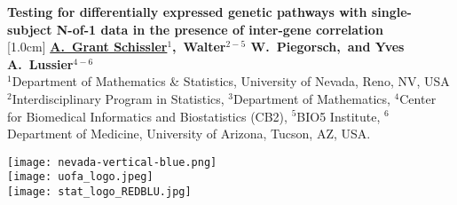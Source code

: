 \documentclass[a0,portrait]{a0poster}
\begin{document}


\begin{minipage}[b]{0.8\linewidth}
\VeryHuge \color{NavyBlue} \textbf{Testing for differentially expressed genetic pathways with single-subject N-of-1 data in the presence of inter-gene correlation~\cite{Schissler2018}} \color{Black}\\ %
[1.0cm]
\Huge \textbf{\underline{A.~Grant Schissler$^{1}$},~Walter$^{2-5}$ W.~Piegorsch,~and Yves A.~Lussier$^{4-6}$}\\[0.5cm] %
\huge $^{1}$Department of Mathematics \& Statistics, University of Nevada, Reno, NV, USA\\[0.4cm] %
{\huge $^{2}$Interdisciplinary Program in Statistics, $^{3}$Department of Mathematics, $^{4}$Center for Biomedical Informatics and Biostatistics (CB2), $^{5}$BIO5 Institute, $^{6}$Department of Medicine, University of Arizona, Tucson, AZ, USA}.
\end{minipage}
%
\begin{minipage}[b]{0.2\linewidth}
  \centering
  \texttt{[image: nevada-vertical-blue.png]}\\
  \texttt{[image: uofa\_logo.jpeg]}\\
  \texttt{[image: stat\_logo\_REDBLU.jpg]}\\
\end{minipage}

\vspace{0cm} %

\end{document}
